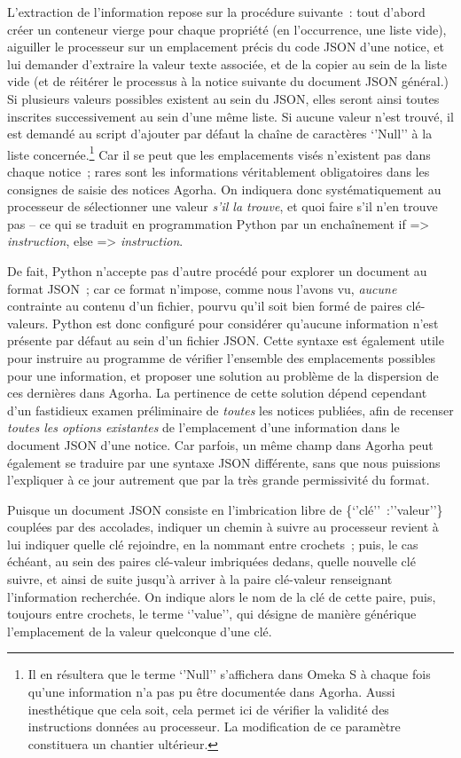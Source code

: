\documentclass[a4paper,12pt, twoside]{book}
\begin{document}
L’extraction de l’information repose sur la procédure suivante~: tout d’abord créer un conteneur vierge pour chaque propriété (en l’occurrence, une liste vide), aiguiller le processeur sur un emplacement précis du code JSON d’une notice, et lui demander d’extraire la valeur texte associée, et de la copier au sein de la liste vide (et de réitérer le processus à la notice suivante du document JSON général.) Si plusieurs valeurs possibles existent au sein du JSON, elles seront ainsi toutes inscrites successivement au sein d’une même liste. Si aucune valeur n’est trouvé, il est demandé au script d’ajouter par défaut la chaîne de caractères \textsf{‘’Null’’} à la liste concernée.\footnote{Il en résultera que le terme \textsf{‘’Null’’} s’affichera dans Omeka S à chaque fois qu’une information n’a pas pu être documentée dans Agorha. Aussi inesthétique que cela soit, cela permet ici de vérifier la validité des instructions données au processeur. La modification de ce paramètre constituera un chantier ultérieur.} Car il se peut que les emplacements visés n’existent pas dans chaque notice~; rares sont les informations véritablement obligatoires dans les consignes de saisie des notices Agorha. On indiquera donc systématiquement au processeur de sélectionner une valeur \textit{s’il la trouve}, et quoi faire s’il n’en trouve pas – ce qui se traduit en programmation Python par un enchaînement \textsf{if} => \textit{instruction},
\textsf{else} => \textit{instruction}.

De fait, Python n’accepte pas d’autre procédé pour explorer un document au format JSON~; car ce format n’impose, comme nous l’avons vu, \textit{aucune} contrainte au contenu d’un fichier, pourvu qu’il soit bien formé de paires clé-valeurs. Python est donc configuré pour considérer qu’aucune information n’est présente par défaut au sein d’un fichier JSON. Cette syntaxe est également utile pour instruire au programme de vérifier l’ensemble des emplacements possibles pour une information, et proposer une solution au problème de la dispersion de ces dernières dans Agorha. La pertinence de cette solution dépend cependant d’un fastidieux examen préliminaire de \textit{toutes} les notices publiées, afin de recenser \textit{toutes les options existantes} de l’emplacement d’une information dans le document JSON d’une notice. Car parfois, un même champ dans Agorha peut également se traduire par une syntaxe JSON différente, sans que nous puissions l’expliquer à ce jour autrement que par la très grande permissivité du format.

Puisque un document JSON consiste en l’imbrication libre de \textsf{\{‘’clé’’~:’’valeur’’\}} couplées par des accolades, indiquer un chemin à suivre au processeur revient à lui indiquer quelle clé rejoindre, en la nommant entre crochets~; puis, le cas échéant, au sein des paires clé-valeur imbriquées dedans, quelle nouvelle clé suivre, et ainsi de suite jusqu’à arriver à la paire clé-valeur renseignant l’information recherchée. On indique alors le nom de la clé de cette paire, puis, toujours entre crochets, le terme \textsf{‘’value’’}, qui désigne de manière générique l’emplacement de la valeur quelconque d’une clé.
\end{document}
